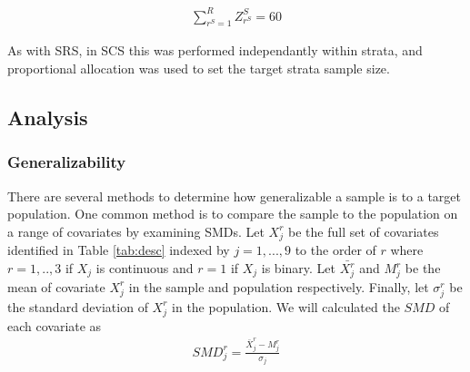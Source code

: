 \documentclass[man,floatsintext]{apa6}
\theoremstyle{definition}
\theoremstyle{definition}
\theoremstyle{definition}
\theoremstyle{remark}
\begin{document}
\begin{align} \label{eq:rankCS}
  \sum_{r^S=1}^R{Z^S_{r^S} = 60}
\end{align}

As with SRS, in SCS this was performed independantly within strata, and
proportional allocation was used to set the target strata sample size.

\hypertarget{analysis}{%
\subsection{Analysis}\label{analysis}}

\hypertarget{generalizability}{%
\subsubsection{Generalizability}\label{generalizability}}

There are several methods to determine how generalizable a sample is to
a target population. One common method is to compare the sample to the
population on a range of covariates by examining SMDs. Let \(X^r_j\) be
the full set of covariates identified in Table \ref{tab:desc} indexed by
\(j = 1,...,9\) to the order of \(r\) where \(r = 1,..,3\) if \(X_j\) is
continuous and \(r = 1\) if \(X_j\) is binary. Let \(\bar{X^r_j}\) and
\(M^r_j\) be the mean of covariate \(X^r_j\) in the sample and
population respectively. Finally, let \(\sigma^r_j\) be the standard
deviation of \(X^r_j\) in the population. We will calculated the \(SMD\)
of each covariate as \begin{align}
  SMD^r_{j} = \frac{\bar{X}^{r}_{j}-M^{r}_{j}}{\sigma_{j}}
\end{align}
\end{document}
